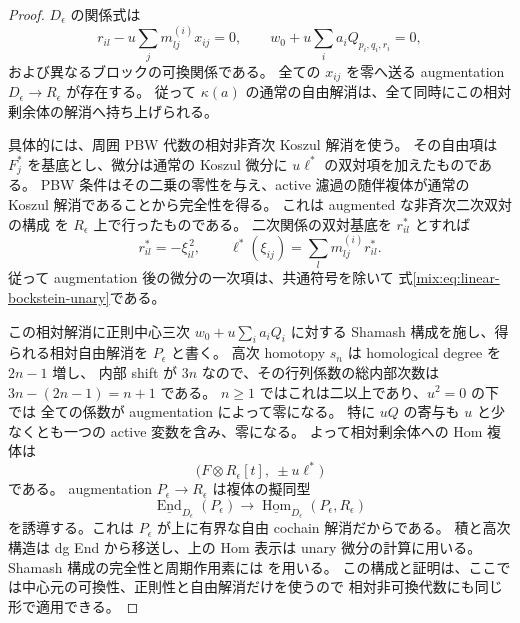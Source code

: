 \begin{proof}
$D_\epsilon$ の関係式は
\[
 r_{il}-u\sum_jm^{(i)}_{lj}x_{ij}=0,
 \qquad w_0+u\sum_i a_iQ_{p_i,q_i,r_i}=0,
\]
および異なるブロックの可換関係である。
全ての $x_{ij}$ を零へ送る augmentation
$D_\epsilon\to R_\epsilon$ が存在する。
従って $\kappa(a)$ の通常の自由解消は、全て同時にこの相対剰余体の解消へ持ち上げられる。

具体的には、周囲 PBW 代数の相対非斉次 Koszul 解消を使う。
その自由項は $F_j^*$ を基底とし、微分は通常の Koszul 微分に
$u\ell^*$ の双対項を加えたものである。
PBW 条件はその二乗の零性を与え、active 濾過の随伴複体が通常の
Koszul 解消であることから完全性を得る。
これは augmented な非斉次二次双対の構成
\cite[\S\S2.1--2.5]{CMOPositselskiQL}を $R_\epsilon$ 上で行ったものである。
二次関係の双対基底を $r_{il}^*$ とすれば
\[
       r_{il}^*=-\xi_{il}^{\,2},\qquad
       \ell^*(\xi_{ij})=\sum_lm^{(i)}_{lj}r_{il}^*.
\]
従って augmentation 後の微分の一次項は、共通符号を除いて
式\eqref{mix:eq:linear-bockstein-unary}である。

この相対解消に正則中心三次 $w_0+u\sum_i a_iQ_i$ に対する
Shamash 構成を施し、得られる相対自由解消を $P_\epsilon$ と書く。
高次 homotopy $s_n$ は homological degree を $2n-1$ 増し、
内部 shift が $3n$ なので、その行列係数の総内部次数は
$3n-(2n-1)=n+1$ である。
$n\ge1$ ではこれは二以上であり、$u^2=0$ の下では
全ての係数が augmentation によって零になる。
特に $uQ$ の寄与も $u$ と少なくとも一つの active 変数を含み、零になる。
よって相対剰余体への Hom 複体は
\begin{equation}\label{mix:eq:linear-bockstein-relative-hom}
       \bigl(F\otimes R_\epsilon[t],\ \pm u\ell^*\bigr)
\end{equation}
である。
augmentation $P_\epsilon\to R_\epsilon$ は複体の擬同型
\[
 \underline{\operatorname{End}}_{D_\epsilon}(P_\epsilon)
       \longrightarrow
 \underline{\operatorname{Hom}}_{D_\epsilon}(P_\epsilon,R_\epsilon)
\]
を誘導する。これは $P_\epsilon$ が上に有界な自由 cochain 解消だからである。
積と高次構造は dg End から移送し、上の Hom 表示は unary 微分の計算に用いる。
Shamash 構成の完全性と周期作用素には
\cite[Constructions~4.1.1, 4.3.1, Proposition~4.3.2]{CMOEisenbudPeeva}を用いる。
この構成と証明は、ここでは中心元の可換性、正則性と自由解消だけを使うので
相対非可換代数にも同じ形で適用できる。


\end{proof}

